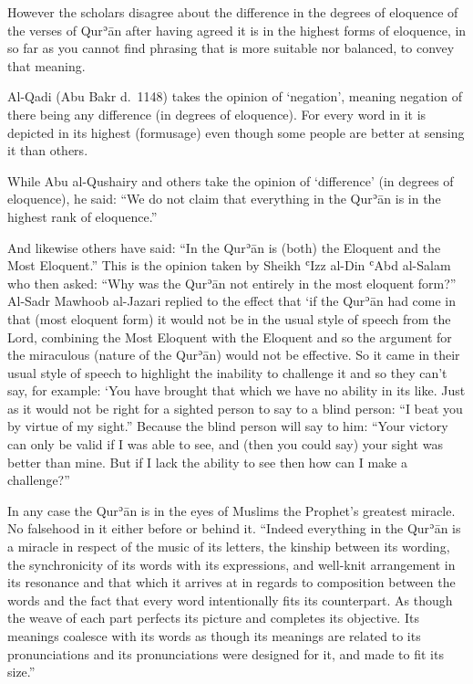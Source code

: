 \documentclass[12pt]{memoir}
\def\´{ʾ} %
\def\`{ʿ} %
\def \Quran{Qur\-\´ān} %
\let \Qrn=\Quran      %
\def\/{\discretionary{/}{}{/}}
\begin{document}

However the scholars disagree about the difference in the degrees of eloquence
of the verses of \Qrn{} after having agreed it is in the highest forms of
eloquence, in so far as you cannot find phrasing that is more suitable nor
balanced, to convey that meaning.

Al-Qadi (Abu Bakr d.\ 1148) takes the opinion of ‘negation’, meaning negation
of there being any difference (in degrees of eloquence). For every word in it
is depicted in its highest (form\/usage) even though some people are better at
sensing it than others.

While Abu al-Qushairy and others take the opinion of ‘difference’ (in degrees
of eloquence), he said: “We do not claim that everything in the \Qrn{} is in
the highest rank of eloquence.”

And likewise others have said:
“In the \Qrn{} is (both) the Eloquent and the Most Eloquent.”
This is the opinion taken by Sheikh \`Izz al-Din \`Abd al-Salam
who then asked: “Why was the \Qrn{} not entirely in the most eloquent form?”
Al-Sadr Mawhoob al-Jazari replied to the effect that ‘if the \Qrn{} had come in
that (most eloquent form) it would not be in the usual style of speech from the
Lord, combining the Most Eloquent with the Eloquent and so the argument for the
miraculous (nature of the \Quran) would not be effective.
So it came in their usual style of speech
to highlight the inability to challenge it and so they can’t say, for example:
‘You have brought that which we have no ability in its like. Just as it would
not be right for a sighted person to say to a blind person: “I beat you by
virtue of my sight.” Because the blind person will say to him: “Your victory
can only be valid if I was able to see, and (then you could say) your sight was
better than mine. But if I lack the ability to see then how can I make a
challenge?”\footnotemark


In any case the \Qrn{} is in the eyes of Muslims the Prophet’s greatest
miracle. No falsehood in it either before or behind it. “Indeed everything in
the \Qrn{} is a miracle in respect of the music of its letters, the kinship
between its wording, the synchronicity of its words with its expressions,
and well-knit arrangement in its resonance and that which it arrives at in
regards to composition between the words and the fact that every word
intentionally fits its counterpart. As though the weave of each part perfects
its picture and completes its objective. Its meanings coalesce with its
words as though its meanings are related to its pronunciations and its
pronunciations were designed for it, and made to fit its size.”\footnotemark
\end{document}
